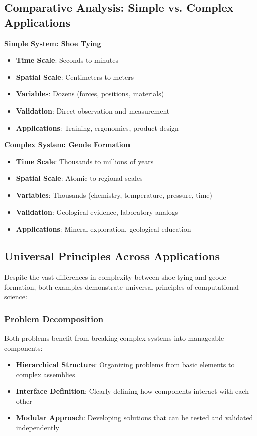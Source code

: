 \subsection{Comparative Analysis: Simple vs. Complex Applications}

\begin{examplecountercard}
\textbf{Simple System: Shoe Tying}
\begin{itemize}
    \item \textbf{Time Scale}: Seconds to minutes
    \item \textbf{Spatial Scale}: Centimeters to meters
    \item \textbf{Variables}: Dozens (forces, positions, materials)
    \item \textbf{Validation}: Direct observation and measurement
    \item \textbf{Applications}: Training, ergonomics, product design
\end{itemize}
\tcblower
\textbf{Complex System: Geode Formation}
\begin{itemize}
    \item \textbf{Time Scale}: Thousands to millions of years
    \item \textbf{Spatial Scale}: Atomic to regional scales
    \item \textbf{Variables}: Thousands (chemistry, temperature, pressure, time)
    \item \textbf{Validation}: Geological evidence, laboratory analogs
    \item \textbf{Applications}: Mineral exploration, geological education
\end{itemize}
\end{examplecountercard}

\subsection{Universal Principles Across Applications}

Despite the vast differences in complexity between shoe tying and geode formation, both examples demonstrate universal principles of computational science:

\subsubsection{Problem Decomposition}

Both problems benefit from breaking complex systems into manageable components:
\begin{itemize}
    \item \textbf{Hierarchical Structure}: Organizing problems from basic elements to complex assemblies
    \item \textbf{Interface Definition}: Clearly defining how components interact with each other
    \item \textbf{Modular Approach}: Developing solutions that can be tested and validated independently
\end{itemize}

